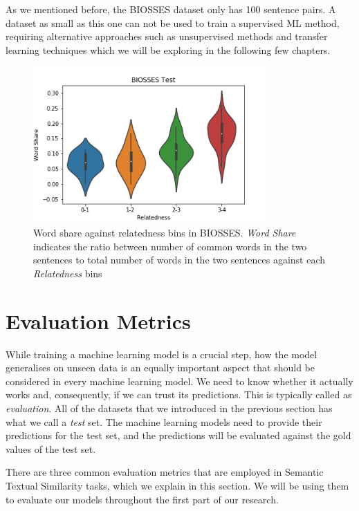 \begin{enumerate}
As we mentioned before, the BIOSSES dataset only has 100 sentence pairs. A dataset as small as this one can not be used to train a supervised ML method, requiring alternative approaches such as unsupervised methods and transfer learning techniques which we will be exploring in the following few chapters.

\begin{figure}
	\centering
	\includegraphics[width=0.8\textwidth]{figures/semantic_textual_similarity/introduction/biosses_word_share.png}
	\caption[Word share against relatedness bins in BIOSSES.]{Word share against relatedness bins in BIOSSES. \textit{Word Share} indicates the ratio between number of common words in the two sentences to total number of words in the two sentences against each \textit{Relatedness} bins}
	\label{fig:biosses_word_share}
\end{figure}


\end{enumerate}

\section{Evaluation Metrics}
\label{sec:sts_evaluation}
While training a machine learning model is a crucial step, how the model generalises on unseen data is an equally important aspect that should be considered in every machine learning model. We need to know whether it actually works and, consequently, if we can trust its predictions. This is typically called as \textit{evaluation}. All of the datasets that we introduced in the previous section has what we call a \textit{test} set. The machine learning models need to provide their predictions for the test set, and the predictions will be evaluated against the gold values of the test set. 

There are three common evaluation metrics that are employed in Semantic Textual Similarity tasks, which we explain in this section. We will be using them to evaluate our models throughout the first part of our research. 

